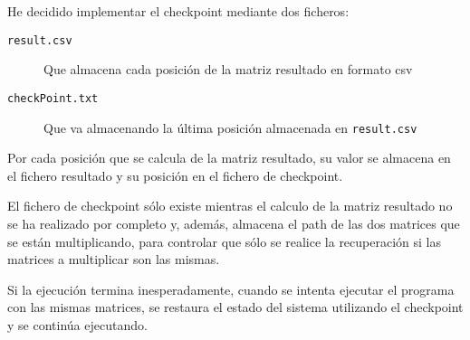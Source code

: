 He decidido implementar el checkpoint mediante dos ficheros:
\begin{description}
	\item [\texttt{result.csv}] Que almacena cada posición de la matriz resultado en formato csv
	\item [\texttt{checkPoint.txt}] Que va almacenando la última posición almacenada en \texttt{result.csv}
\end{description}

Por cada posición que se calcula de la matriz resultado, su valor se almacena en el fichero resultado y su posición en el fichero de checkpoint.

El fichero de checkpoint sólo existe mientras el calculo de la matriz resultado no se ha realizado por completo y, además, almacena el path de las dos matrices que se están multiplicando, para controlar que sólo se realice la recuperación si las matrices a multiplicar son las mismas.

Si la ejecución termina inesperadamente, cuando se intenta ejecutar el programa con las mismas matrices, se restaura el estado del sistema utilizando el checkpoint y se continúa ejecutando.